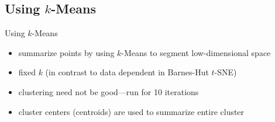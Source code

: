 \documentclass{beamer}
\begin{document}
\subsection{Using $k$-Means}

\begin{frame}[fragile]{Using $k$-Means}
        \begin{itemize}
            \item summarize points by using $k$-Means to segment low-dimensional space
            \item fixed $k$ (in contrast to data dependent in Barnes-Hut $t$-SNE)
            \item clustering need not be good---run for 10 iterations
            \item cluster centers (centroids) are used to summarize
                entire cluster
        \end{itemize}
\end{frame}
\end{document}

